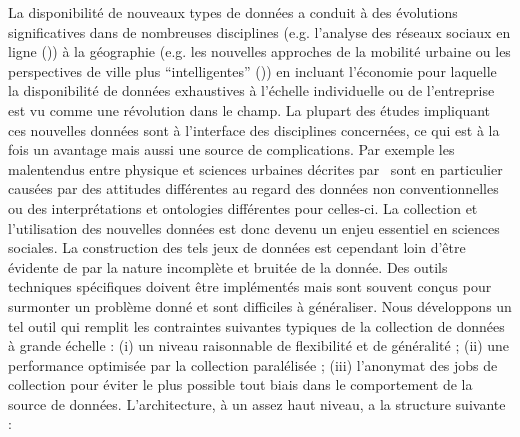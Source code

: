 {La disponibilité de nouveaux types de données a conduit à des évolutions significatives dans de nombreuses disciplines (e.g. l'analyse des réseaux sociaux en ligne (\cite{tan2013social})) à la géographie (e.g. les nouvelles approches de la mobilité urbaine ou les perspectives de ville plus ``intelligentes'' (\cite{batty2013big})) en incluant l'économie pour laquelle la disponibilité de données exhaustives à l'échelle individuelle ou de l'entreprise est vu comme une révolution dans le champ. La plupart des études impliquant ces nouvelles données sont à l'interface des disciplines concernées, ce qui est à la fois un avantage mais aussi une source de complications. Par exemple les malentendus entre physique et sciences urbaines décrites par~\cite{dupuy2015sciences} sont en particulier causées par des attitudes différentes au regard des données non conventionnelles ou des interprétations et ontologies différentes pour celles-ci. La collection et l'utilisation des nouvelles données est donc devenu un enjeu essentiel en sciences sociales. La construction des tels jeux de données est cependant loin d'être évidente de par la nature incomplète et bruitée de la donnée. Des outils techniques spécifiques doivent être implémentés mais sont souvent conçus pour surmonter un problème donné et sont difficiles à généraliser. Nous développons un tel outil qui remplit les contraintes suivantes typiques de la collection de données à grande échelle : (i) un niveau raisonnable de flexibilité et de généralité ; (ii) une performance optimisée par la collection paralélisée ; (iii) l'anonymat des jobs de collection pour éviter le plus possible tout biais dans le comportement de la source de données. L'architecture, à un assez haut niveau, a la structure suivante : 
}


